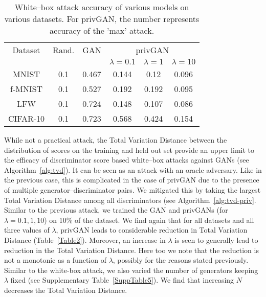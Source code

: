 \documentclass{article}
\begin{document}
\begin{table}[h!]
\small
\begin{center}
\begin{tabular}{c|c|c|c|c|c} 
 \hline
 \multicolumn{1}{c|}{Dataset} & \multicolumn{1}{c|}{Rand.} & \multicolumn{1}{c|}{GAN}&\multicolumn{3}{c}{privGAN}\\
 \cline{4-6}
 \multicolumn{1}{c|}{} & \multicolumn{1}{c|}{}& \multicolumn{1}{c|}{} & $\lambda=0.1$ & $\lambda=1$ & $\lambda=10$ 
 \\ \hline
MNIST  & 0.1 & 0.467 & 0.144 & 0.12 & 0.096\\ 
 f-MNIST  & 0.1 & 0.527 & 0.192 & 0.192 & 0.095\\
 LFW & 0.1 & 0.724 & 0.148 & 0.107 & 0.086\\ 
 CIFAR-10 & 0.1 & 0.723 & 0.568 & 0.424 & 0.154\\
 \hline
\end{tabular}
\end{center}
 \caption{White--box attack accuracy of various models on various datasets. For privGAN, the number represents accuracy of the 'max' attack.}
 \label{Table1}
\end{table}

While not a practical attack, the Total Variation Distance between the distribution of scores on the training and held out set provide an upper limit to the efficacy of discriminator score based white--box attacks against GANs (see Algorithm~\ref{alg:tvd}). It can be seen as an attack with an oracle adversary. Like in the previous case, this is complicated in the case of privGAN due to the presence of multiple generator--discriminator pairs. We mitigated this by taking the largest Total Variation Distance among all discriminators (see Algorithm~\ref{alg:tvd-priv}. Similar to the previous attack, we trained the GAN and privGANs (for $\lambda= 0.1,1,10$) on 10\% of the dataset. We find again that for all datasets and all three values of $\lambda$, privGAN leads to considerable reduction in Total Variation Distance (Table~\ref{Table2}). Moreover, an increase in $\lambda$ is seen to generally lead to reduction in the Total Variation Distance. Here too we note that the reduction is not a monotonic as a function of $\lambda$, possibly for the reasons stated previously. Similar to the white-box attack, we also varied the number of generators keeping $\lambda$ fixed (see Supplementary Table~\ref{SuppTable5}). We find that increasing $N$ decreases the Total Variation Distance. 
\end{document}
